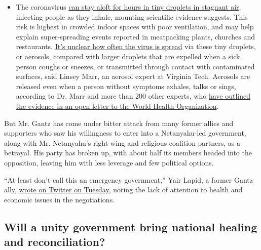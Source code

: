 \begin{itemize}
  \begin{itemize}
  \tightlist
  \item
    The coronavirus
    \href{https://www.nytimes3xbfgragh.onion/2020/07/04/health/239-experts-with-one-big-claim-the-coronavirus-is-airborne.html?action=click\&pgtype=Article\&state=default\&region=MAIN_CONTENT_3\&context=storylines_faq}{can
    stay aloft for hours in tiny droplets in stagnant air}, infecting
    people as they inhale, mounting scientific evidence suggests. This
    risk is highest in crowded indoor spaces with poor ventilation, and
    may help explain super-spreading events reported in meatpacking
    plants, churches and restaurants.
    \href{https://www.nytimes3xbfgragh.onion/2020/07/06/health/coronavirus-airborne-aerosols.html?action=click\&pgtype=Article\&state=default\&region=MAIN_CONTENT_3\&context=storylines_faq}{It's
    unclear how often the virus is spread} via these tiny droplets, or
    aerosols, compared with larger droplets that are expelled when a
    sick person coughs or sneezes, or transmitted through contact with
    contaminated surfaces, said Linsey Marr, an aerosol expert at
    Virginia Tech. Aerosols are released even when a person without
    symptoms exhales, talks or sings, according to Dr. Marr and more
    than 200 other experts, who
    \href{https://academic.oup.com/cid/article/doi/10.1093/cid/ciaa939/5867798}{have
    outlined the evidence in an open letter to the World Health
    Organization}.
  \end{itemize}
\end{itemize}

But Mr. Gantz has come under bitter attack from many former allies and
supporters who saw his willingness to enter into a Netanyahu-led
government, along with Mr. Netanyahu's right-wing and religious
coalition partners, as a betrayal. His party has broken up, with about
half its members headed into the opposition, leaving him with less
leverage and few political options.

``At least don't call this an emergency government,'' Yair Lapid, a
former Gantz ally,
\href{https://twitter.com/yairlapid/status/1249954842640093185}{wrote on
Twitter on Tuesday}, noting the lack of attention to health and economic
issues in the negotiations.

\hypertarget{will-a-unity-government-bring-national-healing-and-reconciliation}{%
\subsection{Will a unity government bring national healing and
reconciliation?}\label{will-a-unity-government-bring-national-healing-and-reconciliation}}

